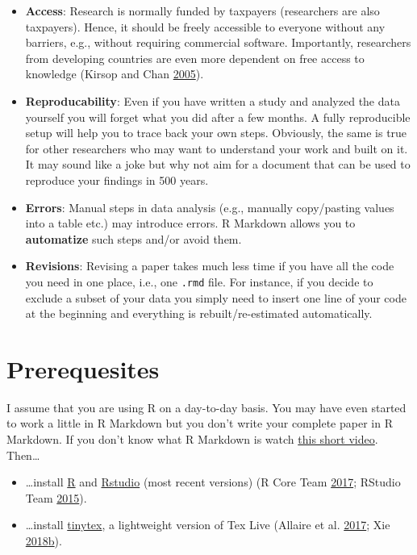 \documentclass[
  12pt,
]{article}
\providecommand{\tightlist}{%
  \setlength{\itemsep}{0pt}\setlength{\parskip}{0pt}}
\begin{document}
\begin{itemize}
\tightlist
\item
  \textbf{Access}: Research is normally funded by taxpayers (researchers are also taxpayers). Hence, it should be freely accessible to everyone without any barriers, e.g., without requiring commercial software. Importantly, researchers from developing countries are even more dependent on free access to knowledge (Kirsop and Chan \protect\hyperlink{ref-Kirsop2005-ro}{2005}).
\item
  \textbf{Reproducability}: Even if you have written a study and analyzed the data yourself you will forget what you did after a few months. A fully reproducible setup will help you to trace back your own steps. Obviously, the same is true for other researchers who may want to understand your work and built on it. It may sound like a joke but why not aim for a document that can be used to reproduce your findings in 500 years.
\item
  \textbf{Errors}: Manual steps in data analysis (e.g., manually copy/pasting values into a table etc.) may introduce errors. R Markdown allows you to \textbf{automatize} such steps and/or avoid them.
\item
  \textbf{Revisions}: Revising a paper takes much less time if you have all the code you need in one place, i.e., one \texttt{.rmd} file. For instance, if you decide to exclude a subset of your data you simply need to insert one line of your code at the beginning and everything is rebuilt/re-estimated automatically.
\end{itemize}

\hypertarget{prerequesites}{%
\section{Prerequesites}\label{prerequesites}}

I assume that you are using R on a day-to-day basis. You may have even started to work a little in R Markdown but you don't write your complete paper in R Markdown. If you don't know what R Markdown is watch \href{https://vimeo.com/178485416}{this short video}. Then\ldots{}

\begin{itemize}
\tightlist
\item
  \ldots install \href{https://www.r-project.org/}{R} and \href{https://www.rstudio.com/}{Rstudio} (most recent versions) (R Core Team \protect\hyperlink{ref-R2017}{2017}; RStudio Team \protect\hyperlink{ref-Rstudio2015}{2015}).
\item
  \ldots install \href{https://yihui.name/tinytex/}{tinytex}, a lightweight version of Tex Live (Allaire et al. \protect\hyperlink{ref-markdown2017}{2017}; Xie \protect\hyperlink{ref-tinytex}{2018}\protect\hyperlink{ref-tinytex}{b}).
\end{itemize}
\end{document}
